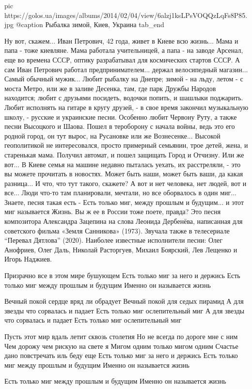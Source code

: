 		 pic https://golos.ua/images/albums/2014/02/04/view/6alzj1ksLPsVOQQzLqFs8P85.jpg
		 @caption Рыбалка зимой, Киев, Украина
  tab_end
\fi

Ну вот, скажем...  Иван Петрович, 42 года, живет в Киеве всю жизнь... Мама и
папа - тоже киевляне.  Мама работала учительницей, а папа - на заводе Арсенал,
еще во времена СССР, оптику разрабатывал для космических стартов СССР.  А сам
Иван Петрович работал предпринимателем... держал велосипедный магазин... Самый
обычный мужик...  Любит рыбалку на Днепре; зимой - на льду, летом - с моста
Метро, или же в заливе Десенка, там, где парк Дружбы Народов находится; любит с
друзьями посидеть, водочки попить, и шашлыки поджарить.  Любит исполнять на
гитаре в кругу друзей, - в свое время закончил музыкальную школу, - русские и
украинские песни.  Особенно любит Червону Руту, а также песни Высоцкого и
Шаова.  Пошел в тероборону с начала войны, ведь это его родной город, он тут
вырос, на Русановке или же Вознесенке... Высокой геополитикой не интересовался,
просто примерный семьянин, трое детей, жена, и старенькая мама.  Получил
автомат, и пошел защищать Город и Отчизну. Или же вот... В Киеве семья на
машине недавно пыталась уехать, их расстреляли, - это вы можете прочитать в
новостях. Может быть наши, может быть ваши, да какая разница... И что, что тут
такого, скажете?  А вот и нет человека, нет людей, вот и все... Люди что-то там
планировали, мечтали, но все оборвалось в один миг...  Знаете, песня такая есть
- Есть только миг, между прошлым и будущим... и этот миг называется Жизнь. Вы ж
ее в России тоже поете, правда?  Это песня композитора Александра Зацепина на
слова Леонида Дербенёва, написанная для советского фильма «Земля Санникова»
(1973).  Звучала также в телесериале \enquote{Перевал Дятлова} (2020). Наиболее
известные исполнители песни: Олег Анофриев, Олег Даль, Николай Расторгуев,
Михаил Боярский, Лев Лещенко и Игорь Наджиев.

\raggedcolumns
\begin{multicols}{2} %
\setlength{\parindent}{0pt}
\obeycr
Призрачно все в этом мире бушующем
Есть только миг за него и держись
Есть только миг между прошлым и будущим
Именно он называется жизнь

Вечный покой сердце вряд ли обрадует
Вечный покой для седых пирамид
А для звезды что сорвалась и падает
Есть только миг ослепительный миг
А для звезды что сорвалась и падает
Есть только миг ослепительный миг

Пусть этот мир вдаль летит сквозь столетия
Но не всегда по дороге мне с ним
Чем дорожу чем рискую на свете я
Мигом одним только мигом одним
Счастье дано повстречать иль беду еще
Есть только миг за него и держись
Есть только миг между прошлым и будущим
Именно он называется жизнь

Есть только миг между прошлым и будущим
Именно он называется жизнь
\restorecr
\end{multicols} %

